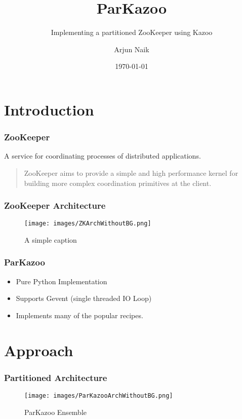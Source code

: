 \documentclass[10pt, compress]{beamer}
\title{ParKazoo}
\subtitle{Implementing a partitioned ZooKeeper using Kazoo}
\date{\today}
\author{Arjun Naik}
\institute{TU Dresden}
\begin{document}
\maketitle

\section{Introduction}

\begin{frame}[fragile]
    \frametitle{ZooKeeper}
    A service for coordinating processes of distributed applications.
    \begin{quote}
        ZooKeeper aims to provide a simple and high performance kernel for building more complex
        coordination primitives at the client. 
    \end{quote}
\end{frame}

\begin{frame}[fragile]
    \frametitle{ZooKeeper Architecture}
    \begin{figure}[ht!]
        \centering
        \texttt{[image: images/ZKArchWithoutBG.png]}
        \caption{A simple caption \label{overflow}}
    \end{figure}
\end{frame}

\begin{frame}[fragile]
    \frametitle{ParKazoo}
    \begin{itemize}
        \item Pure Python Implementation
        \item Supports Gevent (single threaded IO Loop)
        \item Implements many of the popular recipes.
    \end{itemize}
\end{frame}

\section{Approach}
\begin{frame}[fragile]
    \frametitle{Partitioned Architecture}
    \begin{figure}[ht!]
        \centering
        \texttt{[image: images/ParKazooArchWithoutBG.png]}
        \caption{ParKazoo Ensemble \label{overflow}}
    \end{figure}
\end{frame}
\end{document}
